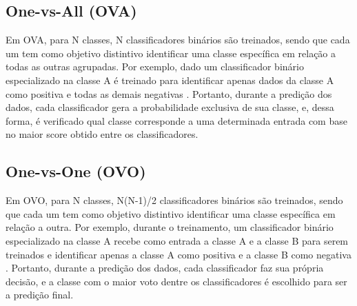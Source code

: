 \subsection{One-vs-All (OVA)}

Em OVA, para N classes, N classificadores binários são treinados, sendo que cada um tem como objetivo
distintivo identificar uma classe específica em relação a todas as outras agrupadas. Por exemplo,
dado um classificador binário especializado na classe A é treinado para identificar
apenas dados da classe A como positiva e todas as demais negativas \cite{zhang2019multi}.
Portanto, durante a predição dos dados, cada classificador gera a probabilidade exclusiva de sua
classe, e, dessa forma, é verificado qual classe corresponde a uma determinada entrada com base
no maior score obtido entre os classificadores.

\subsection{One-vs-One (OVO)}

Em OVO, para N classes, N(N-1)/2 classificadores binários são treinados, sendo que cada um
tem como objetivo distintivo identificar uma classe específica em relação a outra. Por
exemplo, durante o treinamento, um classificador binário especializado na classe A recebe
como entrada a classe A e a classe B para serem treinados e identificar apenas a classe
A como positiva e a classe B como negativa \cite{pawara2020one}. Portanto, durante a predição
dos dados, cada classificador faz sua própria decisão, e a classe com o maior voto dentre os
classificadores é escolhido para ser a predição final.